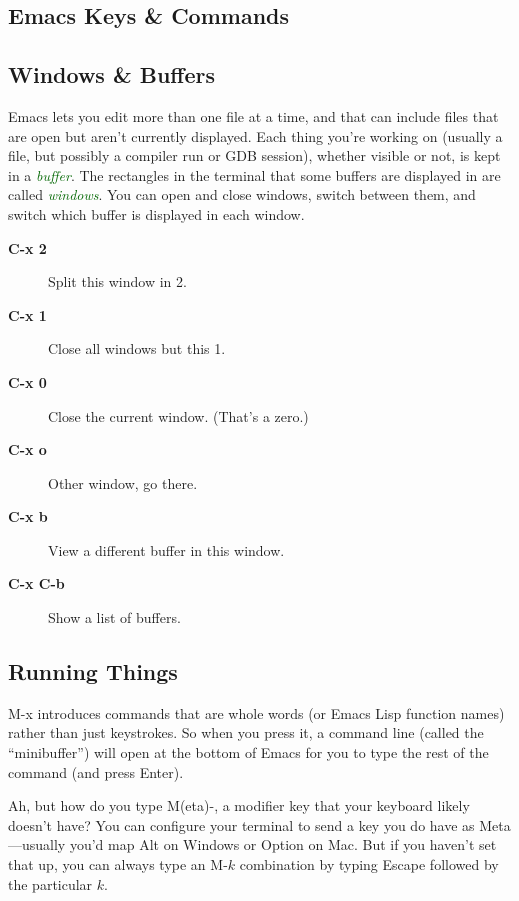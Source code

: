 \documentclass[11pt]{article}
\newcommand\keyterm[1]{\textcolor[HTML]{006600}{\emph{#1}}}
\newenvironment{commands}
{\bgroup
  \let\olditem\item
  \def\item[##1]{\olditem[{\sffamily\upshape\bfseries##1}]}%
  \begin{description}}
  {\end{description}\egroup}
\begin{document}
\begin{multicols}{2}
\section*{Emacs Keys \& Commands}

\subsection*{Windows \& Buffers}

Emacs lets you edit more than one file at a time, and that can include
  files that are open but aren’t currently displayed. Each thing you’re
  working on (usually a file, but possibly a compiler run or GDB
  session), whether visible or not, is kept in a \keyterm{buffer}. The
  rectangles in the terminal that some buffers are displayed in are called
  \keyterm{windows}. You can open and close windows, switch between them,
  and switch which buffer is displayed in each window.

\begin{commands}
\item[C-x 2] Split this window in 2.
\item[C-x 1] Close all windows but this 1.
\item[C-x 0] Close the current window. (That's a zero.)
\item[C-x o] Other window, go there.
\item[C-x b] View a different buffer in this window.
\item[C-x C-b] Show a list of buffers.
\end{commands}

\subsection*{Running Things}

\textsf{M-x} introduces commands that are whole words (or Emacs Lisp
  function names) rather than just keystrokes. So when you press it, a
  command line (called the ``minibuffer'') will open at the bottom of
  Emacs for you to type the rest of the command (and press Enter).

  Ah, but how do you type \textsf{M(eta)-}, a modifier key that your
  keyboard likely doesn’t have? You can configure your terminal to send
  a key you do have as \textsf{Meta}—usually you’d map \textsf{Alt} on
  Windows or \textsf{Option} on Mac. But if you haven’t set that up, you
  can always type an \textsf{M-}$k$ combination by typing
  \textsf{Escape} followed by the particular $k$.


\end{multicols}
\end{document}
